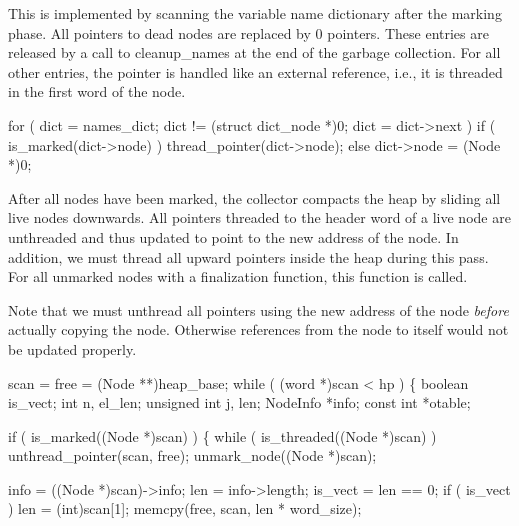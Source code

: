 This is implemented by scanning the variable name dictionary after the
marking phase. All pointers to dead nodes are replaced by {\Tt{}0\nwendquote}
pointers. These entries are released by a call to {\Tt{}cleanup{\_}names\nwendquote} at
the end of the garbage collection. For all other entries, the pointer
is handled like an external reference, i.e., it is threaded in the
first word of the node.

\nwenddocs{}\endmoddef\nwstartdeflinemarkup{}\nwenddeflinemarkup
for ( dict = names_dict; dict != (struct dict_node *)0; dict = dict->next )
    if ( is_marked(dict->node) )
        thread_pointer(dict->node);
    else
        dict->node = (Node *)0;

\nwendcode{}\nwdocspar
After all nodes have been marked, the collector compacts the heap by
sliding all live nodes downwards. All pointers threaded to the header
word of a live node are unthreaded and thus updated to point to the
new address of the node. In addition, we must thread all upward
pointers inside the heap during this pass. For all unmarked nodes with
a finalization function, this function is called.

Note that we must unthread all pointers using the new address of the
node \emph{before} actually copying the node. Otherwise references
from the node to itself would not be updated properly.

\nwenddocs{}\endmoddef\nwstartdeflinemarkup{}\nwenddeflinemarkup
scan = free = (Node **)heap_base;
while ( (word *)scan < hp )
\{
    boolean      is_vect;
    int          n, el_len;
    unsigned int j, len;
    NodeInfo     *info;
    const int    *otable;

    if ( is_marked((Node *)scan) )
    \{
        while ( is_threaded((Node *)scan) )
            unthread_pointer(scan, free);
        unmark_node((Node *)scan);

        info    = ((Node *)scan)->info;
        len     = info->length;
        is_vect = len == 0;
        if ( is_vect )
            len = (int)scan[1];
        memcpy(free, scan, len * word_size);

